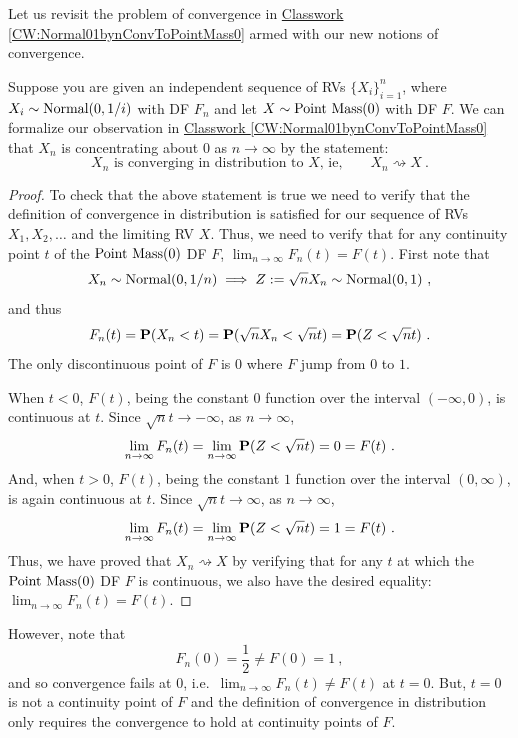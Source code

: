 Let us revisit the problem of convergence in \hyperref[CW:Normal01bynConvToPointMass0]{Classwork \ref*{CW:Normal01bynConvToPointMass0}} armed with our new notions of convergence.
\begin{example}\label{EX:Normal01bynConvinDistToPointMass0}
Suppose you are given an independent sequence of RVs $\{X_i \}_{i=1}^n$, where $X_i \sim \mbox{{\rm Normal}}(0,1/i)$ with DF $F_n$ and let $X \sim \mbox{{\rm Point~Mass}}(0)$ with DF $F$.  We can formalize our observation in \hyperref[CW:Normal01bynConvToPointMass0]{Classwork \ref*{CW:Normal01bynConvToPointMass0}} that $X_n$ is concentrating about $0$ as $n \to \infty$ by the statement:
\[
\text{$X_n$ is converging in distribution to $X$, ie,} \qquad X_n \rightsquigarrow X \ .
\]
{\scriptsize
\begin{proof}
To check that the above statement is true we need to verify that the definition of convergence in distribution is satisfied for our sequence of RVs $X_1,X_2,\ldots$ and the limiting RV $X$.  Thus, we need to verify that for any continuity point $t$ of the $\mbox{{\rm Point~Mass}}(0)$ DF $F$, $\lim_{n \to \infty} F_n(t)=F(t)$.  First note that 
\[
X_n \sim \mbox{{\rm Normal}}(0,1/n) \implies Z := \sqrt{n} X_n \sim \mbox{{\rm Normal}}(0,1) \ ,
\]
and thus
\[
F_n(t) = \mathbf{P}(X_n < t) = \mathbf{P}(\sqrt{n} X_n < \sqrt{n} t) = \mathbf{P}(Z < \sqrt{n} t) \ .
\]
The only discontinuous point of $F$ is $0$ where $F$ jump from $0$ to $1$.  

When $t < 0$, $F(t)$, being the constant $0$ function over the interval $(-\infty,0)$, is continuous at $t$.  Since $\sqrt{n} t \to -\infty$, as $n \to \infty$,
\[
\lim_{n \to \infty} F_n(t)  = \lim_{n \to \infty} \mathbf{P}(Z < \sqrt{n} t) = 0 = F(t) \ .
\]
And, when $t >0$, $F(t)$, being the constant $1$ function over the interval $(0,\infty)$, is again continuous at $t$.  Since $\sqrt{n} t \to \infty$, as $n \to \infty$,
\[
\lim_{n \to \infty} F_n(t)  = \lim_{n \to \infty} \mathbf{P}(Z < \sqrt{n} t) = 1 = F(t) \ .
\]
Thus, we have proved that $X_n \rightsquigarrow X$ by verifying that for any $t$ at which the $\mbox{{\rm Point~Mass}}(0)$ DF $F$ is continuous, we also have the desired equality: $\lim_{n \to \infty} F_n(t)=F(t)$.
\end{proof}
However, note that 
\[
F_n(0)=\frac{1}{2} \neq F(0)=1 \ ,
\]
and so convergence fails at $0$, i.e.~$\lim_{n \to \infty}F_n(t) \neq F(t)$ at $t=0$.  But, $t=0$ is not a continuity point of $F$ and the definition of convergence in distribution only requires the convergence to hold at continuity points of $F$.
}
\end{example}

